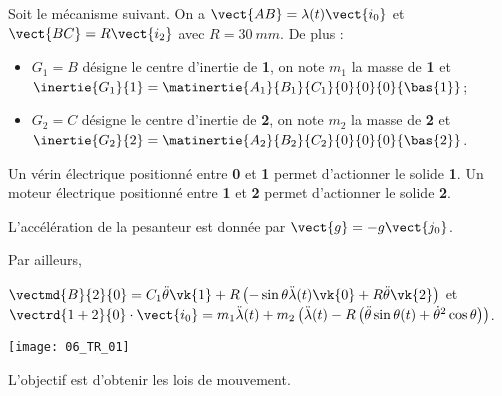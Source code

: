 \normaltrue
\correctionfalse


\setcounter{question}{0}

\ifcorrection
\else
{}
\fi

\ifprof
\else
Soit le mécanisme suivant. On a $\vect{AB}=\lambda(t)\vect{i_0}$ et $\vect{BC}=R\vect{i_2}$ avec $R=\SI{30}{mm}$.
De plus :
\begin{itemize}
\item $G_1=B$ désigne le centre d'inertie de \textbf{1}, on note $m_1$ la masse de \textbf{1} et $\inertie{G_1}{1}=\matinertie{A_1}{B_1}{C_1}{0}{0}{0}{\bas{1}}$; 
\item $G_2=C$ désigne le centre d'inertie de \textbf{2}, on note $m_2$ la masse de \textbf{2} et $\inertie{G_2}{2}=\matinertie{A_2}{B_2}{C_2}{0}{0}{0}{\bas{2}}$.
\end{itemize}

Un vérin électrique positionné entre \textbf{0} et \textbf{1}  permet d'actionner le solide \textbf{1}.
Un moteur électrique positionné entre \textbf{1} et \textbf{2}  permet d'actionner le solide \textbf{2}.

L'accélération de la pesanteur est donnée par $\vect{g}=-g\vect{j_0}$.

Par ailleurs,  

\noindent $\vectmd{B}{2}{0} = C_1  \ddot{\theta} \vk{1} + R\left( -\sin \theta \ddot{\lambda}(t) \vk{0} 
+ R \ddot{\theta} \vk{2}\right)$
et $\vectrd{1+2}{0}\cdot \vect{i_0}=m_1\ddot{\lambda}(t)+m_2\left(\ddot{\lambda}(t)- R \left(\ddot{\theta} \sin\theta(t)  + \dot{\theta}^2 \cos\theta \right)\right)$. 
\begin{center}
\texttt{[image: 06\_TR\_01]}
\end{center}
\fi

L'objectif est d'obtenir les lois de mouvement. 

